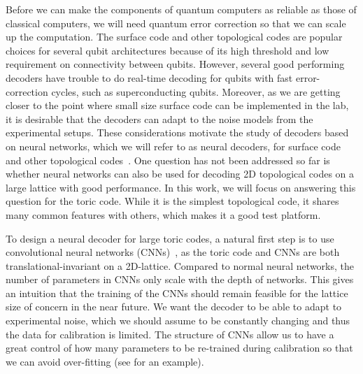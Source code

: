 Before we can make the components of quantum computers as reliable as those of classical computers, we will need quantum error correction so that we can scale up the computation.
The surface code and other topological codes are popular choices for several qubit architectures because of its high threshold and low requirement on connectivity between qubits.
However, several good performing decoders have trouble to do real-time decoding for qubits with fast error-correction cycles, such as superconducting qubits.
Moreover, as we are getting closer to the point where small size surface code can be implemented in the lab, it is desirable that the decoders can adapt to the noise models from the experimental setups.
These considerations motivate the study of decoders based on neural networks, which we will refer to as neural decoders, for surface code and other topological codes~\cite{Baireuther2018Machinelearningassisted,Varsamopoulos2017Decodingsmallsurface,torlai2016neural,Breuckmann2018Scalable,Baireuther2018Neuralcolorcode,Krastanov2017neural,Maskara2018neural,Chamberland2018neural}.
One question has not been addressed so far is whether neural networks can also be used for decoding 2D topological codes on a large lattice with good performance.
In this work, we will focus on answering this question for the toric code.
While it is the simplest topological code, it shares many common features with others, which makes it a good test platform.

To design a neural decoder for large toric codes, a natural first step is to use convolutional neural networks (CNNs)~\cite{lecun1989generalization,Krizhevsky2012imagenet}, as the toric code and CNNs are both translational-invariant on a 2D-lattice.
Compared to normal neural networks, the number of parameters in CNNs only scale with the depth of networks.
This gives an intuition that the training of the CNNs should remain feasible for the lattice size of concern in the near future.
We want the decoder to be able to adapt to experimental noise, which we should assume to be constantly changing and thus the data for calibration is limited.
The structure of CNNs allow us to have a great control of how many parameters to be re-trained during calibration so that we can avoid over-fitting (see  for an example).

